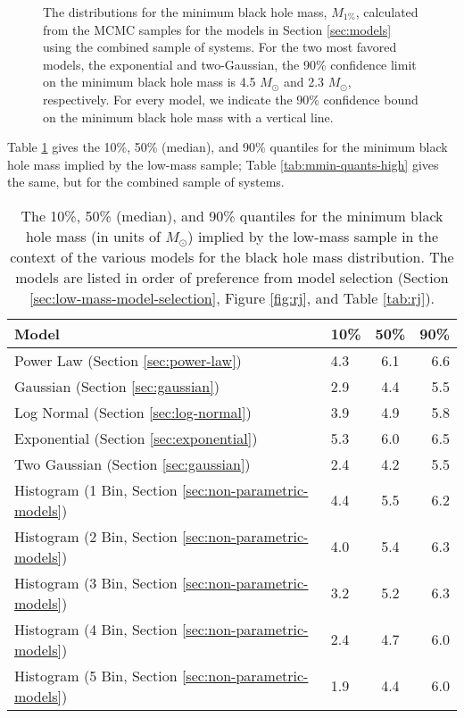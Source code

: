 \documentclass[preprint]{aastex}
\newcommand{\Msun}{M_\odot}
\begin{document}
\begin{figure}
\begin{center}
  \end{center}
  \caption{\label{fig:high-min-mass} The distributions for the minimum
    black hole mass, $M_{1\%}$, calculated from the MCMC samples for
    the models in Section \ref{sec:models} using the combined sample
    of systems.  For the two most favored models, the exponential and
    two-Gaussian, the 90\% confidence limit on the minimum black hole
    mass is 4.5 $\Msun$ and 2.3 $\Msun$, respectively.  For every
    model, we indicate the 90\% confidence bound on the minimum black
    hole mass with a vertical line.}
\end{figure}

Table \ref{tab:mmin-quants} gives the 10\%, 50\% (median), and 90\%
quantiles for the minimum black hole mass implied by the low-mass
sample; Table \ref{tab:mmin-quants-high} gives the same, but for the
combined sample of systems.

\begin{table}
  \begin{center}
    \begin{tabular}{|l|l|c|r|}
      \hline
      Model & 10\% & 50\% & 90\% \\
      \hline \hline
      Power Law (Section \ref{sec:power-law}) & 4.3 & 6.1 & 6.6 \\
      \hline
      Gaussian (Section \ref{sec:gaussian}) & 2.9 & 4.4 & 5.5 \\
      \hline 
      Log Normal (Section \ref{sec:log-normal}) & 3.9 & 4.9 & 5.8 \\
      \hline 
      Exponential (Section \ref{sec:exponential}) & 5.3 & 6.0 & 6.5 \\
      \hline 
      Two Gaussian (Section \ref{sec:gaussian}) & 2.4 & 4.2 & 5.5 \\
      \hline 
      Histogram (1 Bin, Section \ref{sec:non-parametric-models}) & 4.4 & 5.5 & 6.2 \\
      \hline
      Histogram (2 Bin, Section \ref{sec:non-parametric-models}) & 4.0 & 5.4 & 6.3 \\
      \hline 
      Histogram (3 Bin, Section \ref{sec:non-parametric-models}) & 3.2 & 5.2 & 6.3 \\
      \hline
      Histogram (4 Bin, Section \ref{sec:non-parametric-models}) & 2.4 & 4.7 & 6.0 \\
      \hline
      Histogram (5 Bin, Section \ref{sec:non-parametric-models}) & 1.9 & 4.4 & 6.0 \\
      \hline
    \end{tabular}
  \end{center}
  \caption{\label{tab:mmin-quants} The 10\%, 50\% (median), and 90\% quantiles for the minimum black hole mass (in units of $\Msun$) implied by the low-mass sample in the context of the various models for the black hole mass distribution.  The models are listed in order of preference from model selection (Section \ref{sec:low-mass-model-selection}, Figure \ref{fig:rj}, and Table \ref{tab:rj}).}
\end{table}
\end{document}
